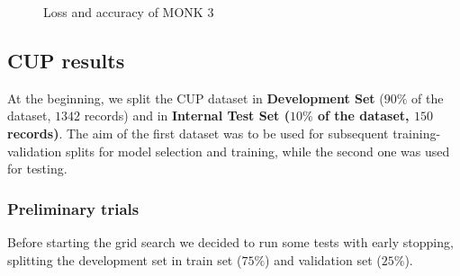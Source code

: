 \begin{figure}
    \centering
    \caption{Loss and accuracy of MONK 3}
    \label{fig:monk3}
\end{figure}


\subsection{CUP results}

At the beginning, we split the CUP dataset in \textbf{Development Set} ($90\%$ of the dataset, $1342$ records) and in  \textbf{Internal Test Set ($10\%$ of the dataset, $150$ records)}. The aim of the first dataset was to be used for subsequent training-validation splits for model selection and training, while the second one was used for testing.

\subsubsection{Preliminary trials}

Before starting the grid search we decided to run some tests with early stopping, splitting the development set in train set ($75\%$) and validation set ($25\%$).

